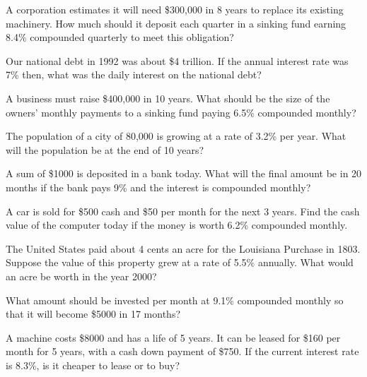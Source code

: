 \begin{puzzle}
    A corporation estimates it will need \$300,000 in 8 years to replace its existing machinery. How much should it deposit each quarter in a sinking fund earning 8.4\% compounded quarterly to meet this obligation?
\end{puzzle}

\begin{puzzle}
    Our national debt in 1992 was about \$4 trillion. If the annual interest rate was 7\% then, what was the daily interest on the national debt?
\end{puzzle}

\begin{puzzle}
    A business must raise \$400,000 in 10 years. What should be the size of the owners’ monthly payments to a sinking fund paying 6.5\% compounded monthly?
\end{puzzle}

\begin{puzzle}
    The population of a city of 80,000 is growing at a rate of 3.2\% per year. What will the population be at the end of 10 years?
\end{puzzle}

\begin{puzzle}
    A sum of \$1000 is deposited in a bank today. What will the final amount be in 20 months if the bank pays 9\% and the interest is compounded monthly?
\end{puzzle}

\begin{puzzle}
    A car is sold for \$500 cash and \$50 per month for the next 3 years. Find the cash value of the computer today if the money is worth 6.2\% compounded monthly.
\end{puzzle}

\begin{puzzle}
    The United States paid about 4 cents an acre for the Louisiana Purchase in 1803. Suppose the value of this property grew at a rate of 5.5\% annually. What would an acre be worth in the year 2000?
\end{puzzle}

\begin{puzzle}
    What amount should be invested per month at 9.1\% compounded monthly so that it will become \$5000 in 17 months?
\end{puzzle}

\begin{puzzle}
    A machine costs \$8000 and has a life of 5 years. It can be leased for \$160 per month for 5 years, with a cash down payment of \$750. If the current interest rate is 8.3\%, is it cheaper to lease or to buy?
\end{puzzle}

